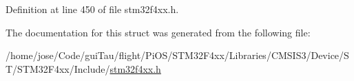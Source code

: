 Definition at line 450 of file stm32f4xx.\-h.



The documentation for this struct was generated from the following file\-:\begin{DoxyCompactItemize}
\item 
/home/jose/\-Code/gui\-Tau/flight/\-Pi\-O\-S/\-S\-T\-M32\-F4xx/\-Libraries/\-C\-M\-S\-I\-S3/\-Device/\-S\-T/\-S\-T\-M32\-F4xx/\-Include/\hyperlink{stm32f4xx_8h}{stm32f4xx.\-h}\end{DoxyCompactItemize}
